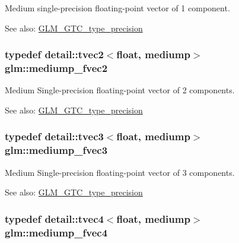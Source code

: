 Medium single-precision floating-point vector of 1 component. \begin{Desc}
\item[See also:]\hyperlink{group__gtc__type__precision}{GLM\_\-GTC\_\-type\_\-precision} \end{Desc}
\hypertarget{group__gtc__type__precision_g5c2686caa6838515f6727eea1b64aa05}{
\subsubsection[mediump\_\-fvec2]{\setlength{\rightskip}{0pt plus 5cm}typedef detail::tvec2$<$float, mediump$>$ {\bf glm::mediump\_\-fvec2}}}
\label{group__gtc__type__precision_g5c2686caa6838515f6727eea1b64aa05}


Medium Single-precision floating-point vector of 2 components. \begin{Desc}
\item[See also:]\hyperlink{group__gtc__type__precision}{GLM\_\-GTC\_\-type\_\-precision} \end{Desc}
\hypertarget{group__gtc__type__precision_g710c3af5ebb05e5e863cff78affd25a6}{
\subsubsection[mediump\_\-fvec3]{\setlength{\rightskip}{0pt plus 5cm}typedef detail::tvec3$<$float, mediump$>$ {\bf glm::mediump\_\-fvec3}}}
\label{group__gtc__type__precision_g710c3af5ebb05e5e863cff78affd25a6}


Medium Single-precision floating-point vector of 3 components. \begin{Desc}
\item[See also:]\hyperlink{group__gtc__type__precision}{GLM\_\-GTC\_\-type\_\-precision} \end{Desc}
\hypertarget{group__gtc__type__precision_gba16de142de00531a1598d83716c6939}{
\subsubsection[mediump\_\-fvec4]{\setlength{\rightskip}{0pt plus 5cm}typedef detail::tvec4$<$float, mediump$>$ {\bf glm::mediump\_\-fvec4}}}
\label{group__gtc__type__precision_gba16de142de00531a1598d83716c6939}


